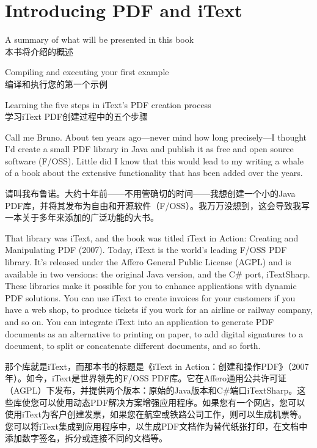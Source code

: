\chapter{Introducing PDF and iText}

\begin{itemizeSum}
    \item  A summary of what will be presented in this book\\本书将介绍的概述

    \item  Compiling and executing your first example\\编译和执行您的第一个示例
    
    \item  Learning the five steps in iText’s PDF creation process\\学习iText PDF创建过程中的五个步骤
\end{itemizeSum}


Call me Bruno. About ten years ago—never mind how long precisely—I thought I’d create a small PDF library in Java and publish it as free and open source software (F/OSS). Little did I know that this would lead to my writing a whale of a book about the extensive functionality that has been added over the years.

请叫我布鲁诺。大约十年前——不用管确切的时间——我想创建一个小的Java PDF库，并将其发布为自由和开源软件（F/OSS）。我万万没想到，这会导致我写一本关于多年来添加的广泛功能的大书。

That library was iText, and the book was titled iText in Action: Creating and Manipulating PDF (2007). Today, iText is the world’s leading F/OSS PDF library. It’s released under the Affero General Public License (AGPL) and is available in two versions: the original Java version, and the C\# port, iTextSharp. These libraries make it possible for you to enhance applications with dynamic PDF solutions. You can use iText to create invoices for your customers if you have a web shop, to produce tickets if you work for an airline or railway company, and so on. You can integrate iText into an application to generate PDF documents as an alternative to 
printing on paper, to add digital signatures to a document, to split or concatenate different documents, and so forth.

那个库就是iText，而那本书的标题是《iText in Action：创建和操作PDF》（2007年）。如今，iText是世界领先的F/OSS PDF库。它在Affero通用公共许可证（AGPL）下发布，并提供两个版本：原始的Java版本和C\#端口iTextSharp。这些库使您可以使用动态PDF解决方案增强应用程序。如果您有一个网店，您可以使用iText为客户创建发票，如果您在航空或铁路公司工作，则可以生成机票等。您可以将iText集成到应用程序中，以生成PDF文档作为替代纸张打印，在文档中添加数字签名，拆分或连接不同的文档等。

